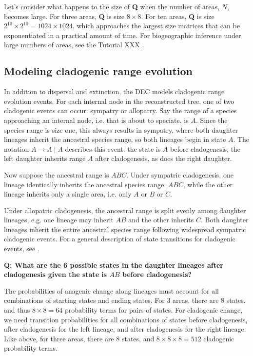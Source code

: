 Let's consider what happens to the size of \textbf{Q} when the number of areas, $N$, becomes large.
For three areas, \textbf{Q} is size $8 \times 8$.
For ten areas, \textbf{Q} is size $2^{10} \times 2^{10} = 1024 \times 1024$, which approaches the largest size matrices that can be exponentiated in a practical amount of time.
For biogeographic inference under large numbers of areas, see the Tutorial XXX \citep{landis13}.


\subsection{Modeling cladogenic range evolution}

In addition to dispersal and extinction, the DEC models cladogenic range evolution events.
For each internal node in the reconstructed tree, one of two cladogenic events can occur: sympatry or allopatry.
Say the range of a species approaching an internal node, i.e. that is about to speciate, is $A$.
Since the species range is size one, this always results in sympatry, where both daughter lineages inherit the ancestral species range, so both lineages begin in state $A$.
The notation $A \rightarrow A \mid A$ describes this event: the state is $A$ before cladogenesis, the left daughter inherits range $A$ after cladogenesis, as does the right daughter.

Now suppose the ancestral range is $ABC$.
Under sympatric cladogenesis, one lineage identically inherits the ancestral species range, $ABC$, while the other lineage inherits only a single area, i.e. only $A$ or $B$ or $C$.

Under allopatric cladogenesis, the ancestral range is split evenly among daughter lineages, e.g. one lineage may inherit $AB$ and the other inherits $C$.
Both daughter lineages inherit the entire ancestral species range following widespread sympatric cladogenic events.
For a general description of state transitions for cladogenic events, see \citet{matzke13}.

{\bf Q: What are the 6 possible states in the daughter lineages after cladogenesis given the state is $AB$ before cladogenesis?}

The probabilities of anagenic change along lineages must account for all combinations of starting states and ending states.
For 3 areas, there are 8 states, and thus $8 \times 8 = 64$ probability terms for pairs of states.
For cladogenic change, we need transition probabilities for all combinations of states before cladogenesis, after cladogenesis for the left lineage, and after cladogenesis for the right lineage.
Like above, for three areas, there are 8 states, and $8 \times 8 \times 8 = 512$ cladogenic probability terms.

